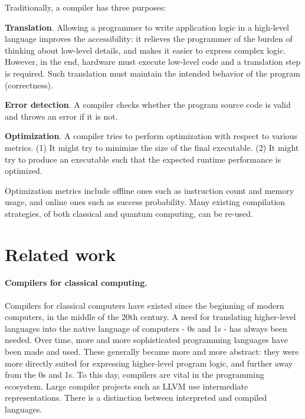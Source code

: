 Traditionally, a compiler has three purposes:

\textbf{Translation}.
Allowing a programmer to write application logic in a high-level language improves the accessibility:
it relieves the programmer of the burden of thinking about low-level details, and makes it easier to express complex logic.
However, in the end, hardware must execute low-level code and a translation step is required.
Such translation must maintain the intended behavior of the program (correctness).

\textbf{Error detection}.
A compiler checks whether the program source code is valid and throws an error if it is not.

\textbf{Optimization}.
A compiler tries to perform optimization with respect to various metrics.
(1) It might try to minimize the size of the final executable.
(2) It might try to produce an executable such that the expected runtime performance is optimized.



Optimization metrics include offline ones such as instruction count and memory usage, and online ones such as success probability.
Many existing compilation strategies, of both classical and quantum computing, can be re-used.


\section{Related work}

\paragraph{Compilers for classical computing.}
Compilers for classical computers have existed since the beginning of modern computers, in the middle of the 20th century.
A need for translating higher-level languages into the native language of computers - 0s and 1s - has always been needed.
Over time, more and more sophisticated programming languages have been made and used.
These generally became more and more abstract: they were more directly suited for expressing higher-level program logic, and further away from the 0s and 1s.
To this day, compilers are vital in the programming ecosystem.
Large compiler projects such as LLVM use intermediate representations.
There is a distinction between interpreted and compiled languages.

